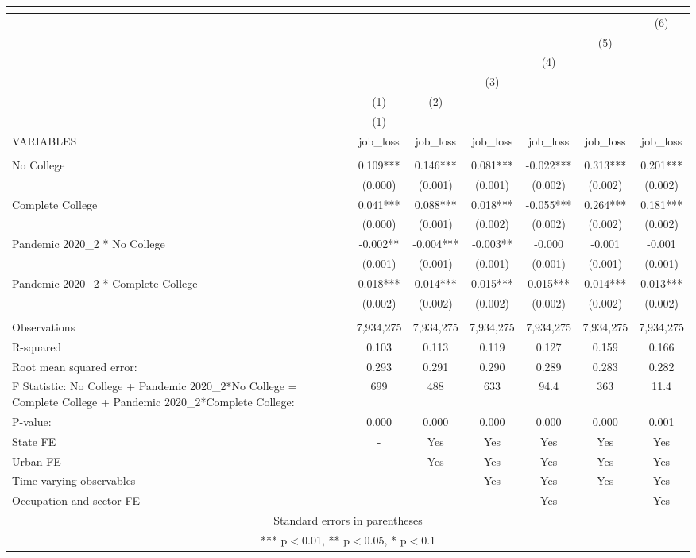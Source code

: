 \begin{tabular}{lcccccc}
\multicolumn{7}{c}{} \\ \hline
 &  &  &  &  &  & (6) \\
 &  &  &  &  & (5) &  \\
 &  &  &  & (4) &  &  \\
 &  &  & (3) &  &  &  \\
 & (1) & (2) &  &  &  &  \\
 & (1) &  &  &  &  &  \\
VARIABLES & job\_loss & job\_loss & job\_loss & job\_loss & job\_loss & job\_loss \\ \hline
 &  &  &  &  &  &  \\
No College & 0.109*** & 0.146*** & 0.081*** & -0.022*** & 0.313*** & 0.201*** \\
 & (0.000) & (0.001) & (0.001) & (0.002) & (0.002) & (0.002) \\
Complete College & 0.041*** & 0.088*** & 0.018*** & -0.055*** & 0.264*** & 0.181*** \\
 & (0.000) & (0.001) & (0.002) & (0.002) & (0.002) & (0.002) \\
Pandemic 2020\_2 * No College & -0.002** & -0.004*** & -0.003** & -0.000 & -0.001 & -0.001 \\
 & (0.001) & (0.001) & (0.001) & (0.001) & (0.001) & (0.001) \\
Pandemic 2020\_2 * Complete College & 0.018*** & 0.014*** & 0.015*** & 0.015*** & 0.014*** & 0.013*** \\
 & (0.002) & (0.002) & (0.002) & (0.002) & (0.002) & (0.002) \\
 &  &  &  &  &  &  \\
Observations & 7,934,275 & 7,934,275 & 7,934,275 & 7,934,275 & 7,934,275 & 7,934,275 \\
R-squared & 0.103 & 0.113 & 0.119 & 0.127 & 0.159 & 0.166 \\
Root mean squared error: & 0.293 & 0.291 & 0.290 & 0.289 & 0.283 & 0.282 \\
F Statistic: No College + Pandemic 2020\_2*No College = Complete College + Pandemic 2020\_2*Complete College: & 699 & 488 & 633 & 94.4 & 363 & 11.4 \\
\hspace{1mm} P-value: & 0.000 & 0.000 & 0.000 & 0.000 & 0.000 & 0.001 \\
State FE & - & Yes & Yes & Yes & Yes & Yes \\
Urban FE & - & Yes & Yes & Yes & Yes & Yes \\
Time-varying observables & - & - & Yes & Yes & Yes & Yes \\
 Occupation and sector FE & - & - & - & Yes & - & Yes \\ \hline
\multicolumn{7}{c}{ Standard errors in parentheses} \\
\multicolumn{7}{c}{ *** p$<$0.01, ** p$<$0.05, * p$<$0.1} \\
\end{tabular}
